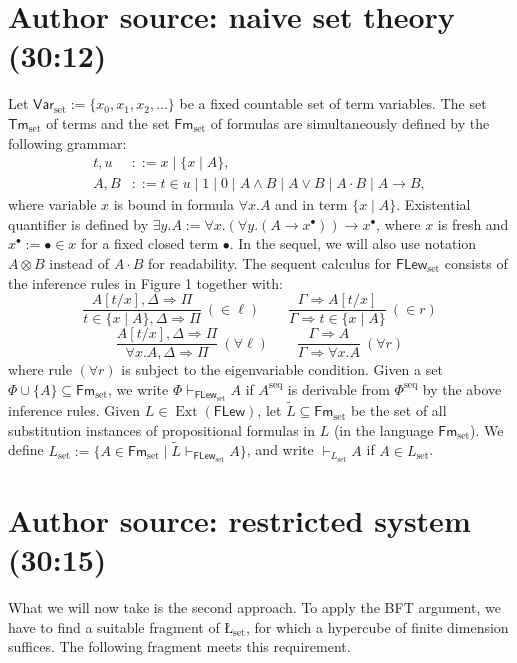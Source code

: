 \documentclass[10pt,a4paper]{article}
\newcommand{\FLew}{\mathsf{FLew}}
\newcommand{\Luk}{\text{\L}}
\begin{document}
\section*{Author source: naive set theory (30:12)}
Let $\mathsf{Var}_{\mathrm{set}}:=\{x_0,x_1,x_2,\ldots\}$ be a fixed countable set of term variables. The set $\mathsf{Tm}_{\mathrm{set}}$ of terms and the set $\mathsf{Fm}_{\mathrm{set}}$ of formulas are simultaneously defined by the following grammar:
\[
 \begin{aligned}
 t,u&::=x\mid\{x\mid A\},\\
 A,B&::=t\in u\mid1\mid0\mid A\wedge B\mid A\vee B\mid A\cdot B\mid A\to B,
 \end{aligned}
\]
where variable $x$ is bound in formula $\forall x.A$ and in term $\{x\mid A\}$. Existential quantifier is defined by $\exists y.A:=\forall x.(\forall y.(A\to x^{\bullet}))\to x^{\bullet}$, where $x$ is fresh and $x^{\bullet}:=\bullet\in x$ for a fixed closed term $\bullet$. In the sequel, we will also use notation $A\otimes B$ instead of $A\cdot B$ for readability.
The sequent calculus for $\FLew_{\mathrm{set}}$ consists of the inference rules in Figure 1 together with:
\[
 \frac{A[t/x],\Delta\Rightarrow\Pi}{t\in\{x\mid A\},\Delta\Rightarrow\Pi}\ (\in\ell)\qquad
 \frac{\Gamma\Rightarrow A[t/x]}{\Gamma\Rightarrow t\in\{x\mid A\}}\ (\in r)
\]
\[
 \frac{A[t/x],\Delta\Rightarrow\Pi}{\forall x.A,\Delta\Rightarrow\Pi}\ (\forall\ell)\qquad
 \frac{\Gamma\Rightarrow A}{\Gamma\Rightarrow\forall x.A}\ (\forall r)
\]
where rule $(\forall r)$ is subject to the eigenvariable condition.
Given a set $\Phi\cup\{A\}\subseteq\mathsf{Fm}_{\mathrm{set}}$, we write $\Phi\vdash_{\FLew_{\mathrm{set}}}A$ if $A^{\mathrm{seq}}$ is derivable from $\Phi^{\mathrm{seq}}$ by the above inference rules.
Given $L\in\operatorname{Ext}(\FLew)$, let $\widetilde L\subseteq\mathsf{Fm}_{\mathrm{set}}$ be the set of all substitution instances of propositional formulas in $L$ (in the language $\mathsf{Fm}_{\mathrm{set}}$). We define $L_{\mathrm{set}}:=\{A\in\mathsf{Fm}_{\mathrm{set}}\mid\widetilde L\vdash_{\FLew_{\mathrm{set}}}A\}$, and write $\vdash_{L_{\mathrm{set}}}A$ if $A\in L_{\mathrm{set}}$.
\section*{Author source: restricted system (30:15)}
What we will now take is the second approach. To apply the BFT argument, we have to find a suitable fragment of $\Luk_{\mathrm{set}}$, for which a hypercube of finite dimension suffices. The following fragment meets this requirement.
\end{document}

